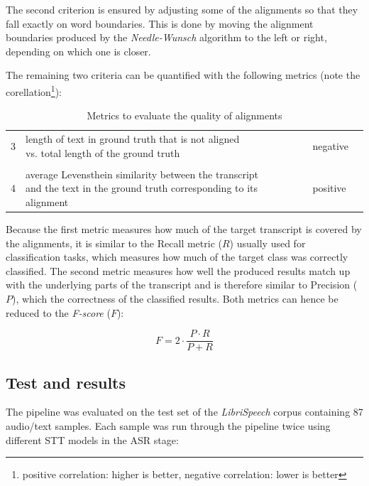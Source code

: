 The second criterion is ensured by adjusting some of the alignments so that they fall exactly on word boundaries. This is done by moving the alignment boundaries produced by the \textit{Needle-Wunsch} algorithm to the left or right, depending on which one is closer. 

The remaining two criteria can be quantified with the following metrics (note the corellation\footnote{positive correlation: higher is better, negative correlation: lower is better}):

\begin{table}[!htbp]
	\centering
	\begin{tabular}{llll}
		\toprule
		\thead{criterion} & \thead{metric} & \thead{correlation} \\
		\midrule
		3 & \makecell[l]{length of text in ground truth that is not aligned\\vs. total length of the ground truth} & negative\\ \\ 	
		4 & \makecell[l]{average Levensthein similarity between the transcript\\and the text in the ground truth corresponding to its alignment} & positive \\ 
		\bottomrule
	\end{tabular}
	\caption{Metrics to evaluate the quality of alignments}
	\label{LM_evaluation}
\end{table}

Because the first metric measures how much of the target transcript is covered by the alignments, it is similar to the Recall metric ($R$) usually used for classification tasks, which measures how much of the target class was correctly classified. The second metric measures how well the produced results match up with the underlying parts of the transcript and is therefore similar to Precision ($P$), which the correctness of the classified results. Both metrics can hence be reduced to the \textit{F-score} ($F$):

\[ 
F = 2\cdot \frac{P\cdot R}{P+R}
 \]

\subsection{Test and results}

The pipeline was evaluated on the test set of the \textit{LibriSpeech} corpus containing 87 audio/text samples. Each sample was run through the pipeline twice using different \ac{STT} models in the \ac{ASR} stage:

